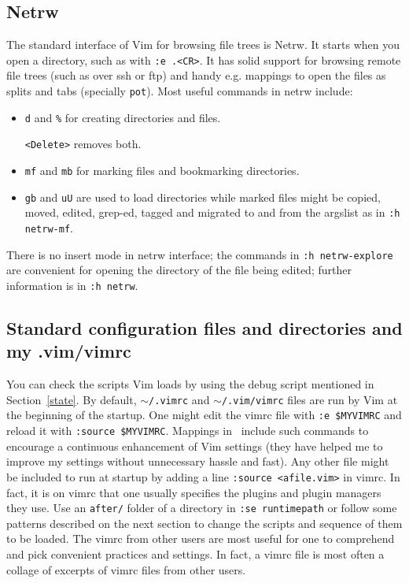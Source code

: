 \documentclass{article}
\newcommand{\ttt}[1] {
	\texttt{<#1>}}
\newcommand{\tttt}[1]{\texttt{#1}}
\begin{document}
\subsection{Netrw}\label{netrw}
The standard interface of Vim for browsing file trees is Netrw.
It starts when you open a directory, such as with \tttt{:e .<CR>}.
It has solid support for browsing remote file trees (such as over ssh or
ftp) and handy e.g. mappings to open the files as splits and tabs
(specially \tttt{pot}).
Most useful commands in netrw include:
\begin{itemize}
  \item \tttt{d} and \tttt{\%} for creating directories and files.
    \ttt{Delete} removes both.
  \item \tttt{mf} and \tttt{mb} for marking files and bookmarking directories.
  \item \tttt{gb} and \tttt{uU} are used to load directories
    while marked files might be copied, moved, edited, grep-ed, tagged and migrated
    to and from the argslist as in \tttt{:h netrw-mf}.
\end{itemize}

There is no insert mode in netrw interface;
the commands in \tttt{:h netrw-explore} are
convenient for opening the directory of the
file being edited;
further information is in \tttt{:h netrw}.

\subsection{Standard configuration files and directories and my .vim/vimrc}
You can check the scripts Vim loads by using the debug script mentioned
in Section~\ref{state}.
By default, \tttt{$\sim$/.vimrc} and \tttt{$\sim$/.vim/vimrc} files are run by Vim at the beginning of the startup.
One might edit the vimrc file with \tttt{:e \$MYVIMRC}
and reload it with \tttt{:source \$MYVIMRC}.
Mappings in~\cite{vimrc} include such commands
to encourage a continuous enhancement of Vim settings
(they have helped me to improve my settings without unnecessary 
hassle and fast).
Any other file might be included to run at startup by
adding a line \tttt{:source <afile.vim>} in vimrc.
In fact, it is on vimrc that one usually specifies the plugins
and plugin managers they use.
Use an \tttt{after/} folder of a directory in \tttt{:se runtimepath}
or follow some patterns described on the next section to change the
scripts and sequence of them to be loaded.
The vimrc from other users are most useful for one to comprehend
and pick convenient practices and settings.
In fact, a vimrc file is most often a collage of excerpts of vimrc
files from other users.
\end{document}
